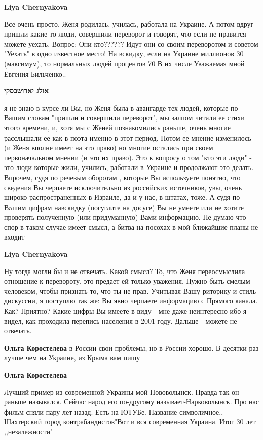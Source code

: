 \begin{itemize}
\begin{itemize}
\textbf{Liya Chernyakova} 

Все очень просто. Женя родилась, училась, работала на Украине. А потом вдруг
пришли какие-то люди, совершили переворот и говорят, что если не нравится -
можете уехать. Вопрос: Они кто?????? Идут они со своим переворотом и советом
"Уехать" в одно известное место! На вскидку, если на Украине миллионов 30
(максимум), то нормальных людей процентов 70 В их числе Уважаемая мной Евгения
Бильченко..

\textbf{אולג יארושבסקי} 

я не знаю в курсе ли Вы, но Женя была в авангарде тех людей, которые по Вашим
словам "пришли и совершили переворот", мы залпом читали ее стихи этого времени,
и, хотя мы с Женей познакомились раньше, очень многие расслышали ее как в поэта
именно в этот период. Потом ее мнение изменилось (и Женя вполне имеет на это
право) но многие остались при своем первоначальном мнении (и это их право). Это
к вопросу о том "кто эти люди" - это люди которые жили, учились, работали в
Украине и продолжают это делать. Впрочем, судя по речевым оборотам , которые Вы
используете понятно, что сведения Вы черпаете исключительно из российских
источников, увы, очень широко распространенных в Израиле, да и у нас, в штатах,
тоже. А судя по Вaшим цифрам навскидку (погуглите на досуге) Вы не умеете или
не хотите проверять полученную (или придуманную) Вами информацию. Не думаю что
спор в таком случае имеет смысл, а битва на посохах в мой ближайшие планы не
входит

\textbf{Liya Chernyakova} 

Ну тогда могли бы и не отвечать. Какой смысл? То, что Женя переосмыслила
отношение к перевороту, это предает ей только уважения. Нужно быть смелым
человеком, чтобы признать то, что ты не прав. Учитывая Вашу риторику и стиль
дискуссии, я поступлю так же: Вы явно черпаете информацию с Прямого канала.
Как? Приятно? Какие цифры Вы имеете в виду - мне даже неинтересно ибо я видел,
как проходила перепись населения в 2001 году. Дальше - можете не отвечать.


\textbf{Ольга Коростелева} в России свои проблемы, но в России хорошо. В десятки раз лучше чем на Украине, из Крыма вам пишу

\textbf{Ольга Коростелева} 

Лучший пример из современной Украины-мой Нововолынск. Правда так он раньше
назывался. Сейчас народ его по-другому называет-Нарковолынск. Про нас фильм сняли
пару лет назад. Есть на ЮТУБе. Название символичное,, Шахтерский город
контрабандистов"Вот и вся современная Украина. Итог 30 лет ,,незалежности"


\end{itemize}
\end{itemize}
